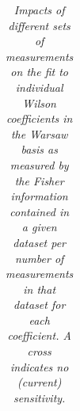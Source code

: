 \documentclass[../report.tex]{subfiles}
\begin{document}
\begin{table}
\begin{tabular}{|c|c|c|c|c|c|c|}
\end{tabular}
\caption{\it Impacts of different sets of measurements on the fit to individual Wilson coefficients in the Warsaw basis as measured by the Fisher information contained in a given dataset per number of measurements in that dataset for each coefficient. A cross indicates no (current) sensitivity.}
\label{tab8:FIpM}
\end{table}
\end{document}
